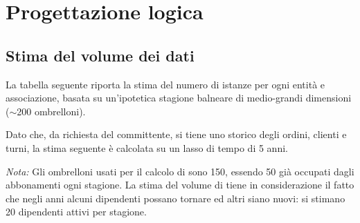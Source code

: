 \chapter{Progettazione logica}
\setlength{\headheight}{25.5pt}
\raggedbottom

\section{Stima del volume dei dati}

La tabella seguente riporta la stima del numero di istanze per ogni entit\`{a} e
associazione, basata su un'ipotetica stagione balneare di medio-grandi dimensioni
($\sim$200 ombrelloni).

Dato che, da richiesta del committente, si tiene uno storico degli ordini, clienti e turni,
la stima seguente è calcolata su un lasso di tempo di 5 anni.

\textit{Nota:} Gli ombrelloni usati per il calcolo di  sono 150, essendo 50
già occupati dagli abbonamenti ogni stagione. La stima del volume di  tiene in considerazione
il fatto che negli anni alcuni dipendenti possano tornare ed altri siano nuovi: si stimano 20 dipendenti attivi per stagione.


